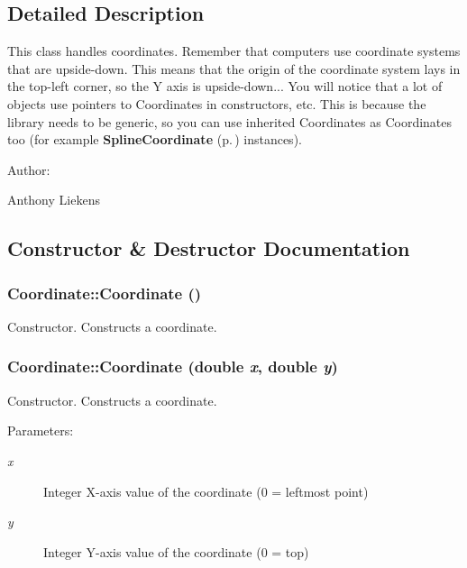 \subsection{Detailed Description}
This class handles coordinates. Remember that computers use coordinate systems that are upside-down. This means that the origin of the coordinate system lays in the top-left corner, so the Y axis is upside-down... You will notice that a lot of objects use pointers to Coordinates in constructors, etc. This is because the library needs to be generic, so you can use inherited Coordinates as Coordinates too (for example {\bf Spline\-Coordinate} {\rm (p.\,\pageref{classSplineCoordinate})} instances). \begin{Desc}
\item[Author: ]\par
Anthony Liekens \end{Desc}




\subsection{Constructor \& Destructor Documentation}
\subsubsection{\setlength{\rightskip}{0pt plus 5cm}Coordinate::Coordinate ()}\label{classCoordinate_a0}


Constructor. Constructs a coordinate. 
\subsubsection{\setlength{\rightskip}{0pt plus 5cm}Coordinate::Coordinate (double {\em x}, double {\em y})}\label{classCoordinate_a1}


Constructor. Constructs a coordinate. \begin{Desc}
\item[Parameters: ]\par
\begin{description}
\item[{\em 
x}]Integer X-axis value of the coordinate (0 = leftmost point) \item[{\em 
y}]Integer Y-axis value of the coordinate (0 = top) \end{description}
\end{Desc}
